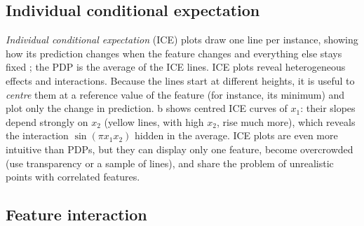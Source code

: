 \subsection{Individual conditional expectation}

\emph{Individual conditional expectation} (ICE) plots draw one line per instance, showing how its
prediction changes when the feature changes and everything else stays fixed \citep{goldstein2015peeking};
the PDP is the average of the ICE lines. ICE plots reveal heterogeneous effects and interactions.
Because the lines start at different heights, it is useful to \emph{centre} them at a reference value
of the feature (for instance, its minimum) and plot only the change in prediction.
b shows centred ICE curves of $x_1$: their slopes depend strongly on $x_2$ (yellow
lines, with high $x_2$, rise much more), which reveals the interaction $\sin(\pi x_1x_2)$ hidden in the
average. ICE plots are even more intuitive than PDPs, but they can display only one feature, become
overcrowded (use transparency or a sample of lines), and share the problem of unrealistic points with
correlated features.

\subsection{Feature interaction}

